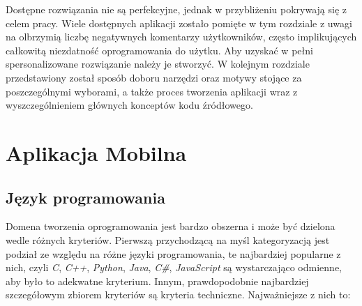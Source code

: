 \documentclass[skorowidz,skroty]{dyplomWEZUT}
\begin{document}
Dostępne rozwiązania nie są perfekcyjne, jednak w przybliżeniu pokrywają się z celem pracy. Wiele dostępnych aplikacji zostało pomięte w tym rozdziale z uwagi na olbrzymią liczbę negatywnych komentarzy użytkowników, często implikujących całkowitą niezdatność oprogramowania do użytku. Aby uzyskać w pełni spersonalizowane rozwiązanie należy je stworzyć. W kolejnym rozdziale przedstawiony został sposób doboru narzędzi oraz motywy stojące za poszczególnymi wyborami, a także proces tworzenia aplikacji wraz z wyszczególnieniem głównych konceptów kodu źródłowego.

\chapter{Aplikacja Mobilna}\label{chap:Mobile App}

\section{Język programowania}\label{sec: language}
Domena tworzenia oprogramowania jest bardzo obszerna i może być dzielona wedle różnych kryteriów. Pierwszą przychodzącą na myśl kategoryzacją jest podział ze względu na różne języki programowania, te najbardziej popularne z nich, czyli \textit{C}, \textit{C++}, \textit{Python}, \textit{Java}, \textit{C\#}, \textit{JavaScript} są wystarczająco odmienne, aby było to adekwatne kryterium. Innym, prawdopodobnie najbardziej szczegółowym zbiorem kryteriów są kryteria techniczne. Najważniejsze z nich to:
\end{document}
